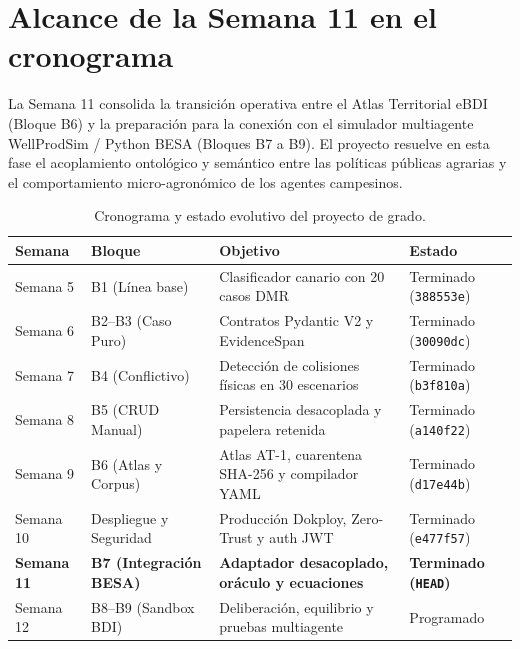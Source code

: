 \documentclass[11pt,a4paper]{article}
\begin{document}
\section{Alcance de la Semana 11 en el cronograma}

La Semana 11 consolida la transici\'on operativa entre el Atlas Territorial eBDI (Bloque B6) y la preparaci\'on para la conexi\'on con el simulador multiagente WellProdSim / Python BESA (Bloques B7 a B9). El proyecto resuelve en esta fase el acoplamiento ontol\'ogico y sem\'antico entre las pol\'iticas p\'ublicas agrarias y el comportamiento micro-agron\'omico de los agentes campesinos.

\begin{table}[H]
\centering
\small
\caption{Cronograma y estado evolutivo del proyecto de grado.}
\label{tab:cronograma}
\begin{tabularx}{\textwidth}{lp{3.2cm}p{5.2cm}X}
\toprule
\textbf{Semana} & \textbf{Bloque} & \textbf{Objetivo} & \textbf{Estado} \\
\midrule
Semana 5 & B1 (L\'inea base) & Clasificador canario con 20 casos DMR & Terminado (\texttt{388553e}) \\
Semana 6 & B2--B3 (Caso Puro) & Contratos Pydantic V2 y EvidenceSpan & Terminado (\texttt{30090dc}) \\
Semana 7 & B4 (Conflictivo) & Detecci\'on de colisiones f\'isicas en 30 escenarios & Terminado (\texttt{b3f810a}) \\
Semana 8 & B5 (CRUD Manual) & Persistencia desacoplada y papelera retenida & Terminado (\texttt{a140f22}) \\
Semana 9 & B6 (Atlas y Corpus) & Atlas AT-1, cuarentena SHA-256 y compilador YAML & Terminado (\texttt{d17e44b}) \\
Semana 10 & Despliegue y Seguridad & Producci\'on Dokploy, Zero-Trust y auth JWT & Terminado (\texttt{e477f57}) \\
\textbf{Semana 11} & \textbf{B7 (Integraci\'on BESA)} & \textbf{Adaptador desacoplado, or\'aculo y ecuaciones} & \textbf{Terminado (\texttt{HEAD})} \\
Semana 12 & B8--B9 (Sandbox BDI) & Deliberaci\'on, equilibrio y pruebas multiagente & Programado \\
\bottomrule
\end{tabularx}
\end{table}

\end{document}
